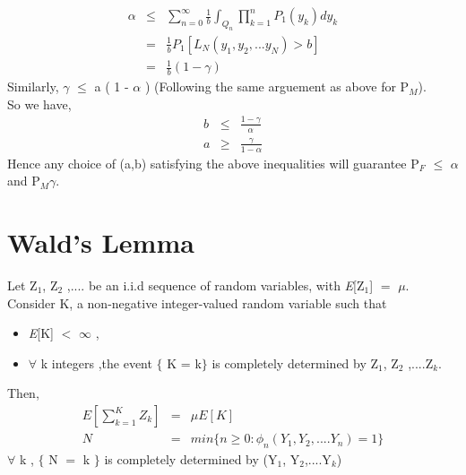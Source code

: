 \documentclass[12pt]{report}
\begin{document}
\begin{eqnarray}
\alpha &\leq & \sum_{n=0}^{\infty} \frac{1}{b} \int_{Q_{n}} \prod_{k=1}^{n} P_{1} (y_k) dy_k\\
&=& \frac{1}{b} \textit{P}_{1}[ L_{N}(y_1,y_2,...y_N) > b]\\
&=& \frac{1}{b} (1 - \gamma)
\end{eqnarray}
\newline
Similarly, $\gamma$ $\leq$ a ( 1 - $\alpha$ ) (Following the same arguement as above for P$_M$).\\
So we have,
\begin{eqnarray}
b &\leq & \frac{1-\gamma}{\alpha}\\
a &\geq & \frac{\gamma}{1-\alpha}
\end{eqnarray}
\newline
Hence any choice of (a,b) satisfying the above inequalities will guarantee P$_{F}$ $\leq$ $\alpha$ and P$_{M}$\leq $\gamma$.
\newline
\section{Wald's Lemma}
Let Z$_1$, Z$_2$ ,.... be an i.i.d sequence of random variables, with \textit{E}[Z$_1$] $=$ 
$\mu$.
Consider K, a non-negative integer-valued random variable such that
\begin{itemize}
	\item \textit{E}[K] $<$ $\infty$ ,
	\item $\forall$ k integers ,the event $\lbrace$ K = k$\rbrace$ is completely determined by Z$_1$, Z$_2$ ,....Z$_k$.
\end{itemize}
Then, 
\begin{eqnarray}
\textit{E}[\sum_{k=1}^{K} Z_k ] &=& \mu \textit{E}[K] \\
N &=& min\lbrace n \geq 0 : \phi_{n} ( Y_1,Y_2,....Y_n ) = 1 \rbrace
\end{eqnarray}
\newline
$\forall$ k , $\lbrace$ N $=$ k $\rbrace$ is completely determined by (Y$_1$, Y$_2$,....Y$_k$)
\newline
\end{document}
